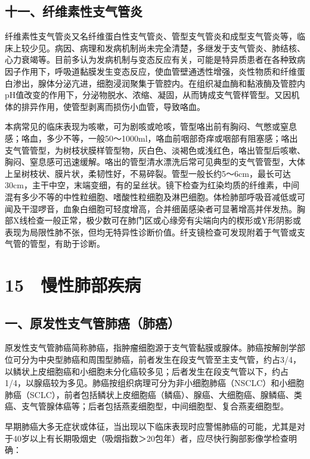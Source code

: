 \subsection{十一、纤维素性支气管炎}

纤维素性支气管炎又名纤维蛋白性支气管炎、管型支气管炎和成型支气管炎等，临床上较少见。病因、病理和发病机制尚未完全清楚，多继发于支气管炎、肺结核、心力衰竭等。目前多认为发病机制与变态反应有关，可能是特异质患者在各种致病因子作用下，呼吸道黏膜发生变态反应，使血管壁通透性增强，炎性物质和纤维蛋白渗出，腺体分泌亢进，细胞浸润聚集于管腔内。在组织凝血酶和黏液酶及管腔内pH值改变的作用下，分泌物脱水、浓缩、凝固，从而铸成支气管样管型。又因机体的排异作用，使管型剥离而损伤小血管，导致咯血。

本病常见的临床表现为咳嗽，可为剧咳或呛咳，管型咯出前有胸闷、气憋或窒息感；咯血，多少不等，一般50～1000ml，咯血前咽部奇痒或咽部有阻塞感；咯出支气管管型，为树枝状膜样管型物，灰白色、淡褐色或浅红色，咯出管型后咳嗽、胸闷、窒息感可迅速缓解。咯出的管型清水漂洗后常可见典型的支气管管型，大体上呈树枝状、膜片状，柔韧性好，不易碎裂。管型一般长约5～6cm，最长可达30cm，主干中空，末端变细，有的呈丝状。镜下检查为红染均质的纤维素，中间混有多少不等的中性粒细胞、嗜酸性粒细胞及淋巴细胞。体检肺部呼吸音减低或可闻及干湿啰音，血象白细胞可轻度增高，合并细菌感染者可显著增高并伴发热。胸部X线检查一般正常，极少数可在肺门区或心缘旁有尖端向内的楔形或Y形阴影或表现为局限性肺不张，但均无特异性诊断价值。纤支镜检查可发现附着于气管或支气管的管型，有助于诊断。

\protect\hypertarget{text00065.html}{}{}

\section{15　慢性肺部疾病}

\subsection{一、原发性支气管肺癌（肺癌）}

原发性支气管肺癌简称肺癌，指肿瘤细胞源于支气管黏膜或腺体。肺癌按解剖学部位可分为中央型肺癌和周围型肺癌，前者发生在段支气管至主支气管，约占3/4，以鳞状上皮细胞癌和小细胞未分化癌较多见；后者发生在段支气管以下，约占1/4，以腺癌较为多见。肺癌按组织病理可分为非小细胞肺癌（NSCLC）和小细胞肺癌（SCLC），前者包括鳞状上皮细胞癌（鳞癌）、腺癌、大细胞癌、腺鳞癌、类癌、支气管腺体癌等；后者包括燕麦细胞型，中间细胞型、复合燕麦细胞型。

早期肺癌大多无症状或体征，当出现以下临床表现时应警惕肺癌的可能，尤其是对于40岁以上有长期吸烟史（吸烟指数＞20包年）者，应尽快行胸部影像学检查明确：


